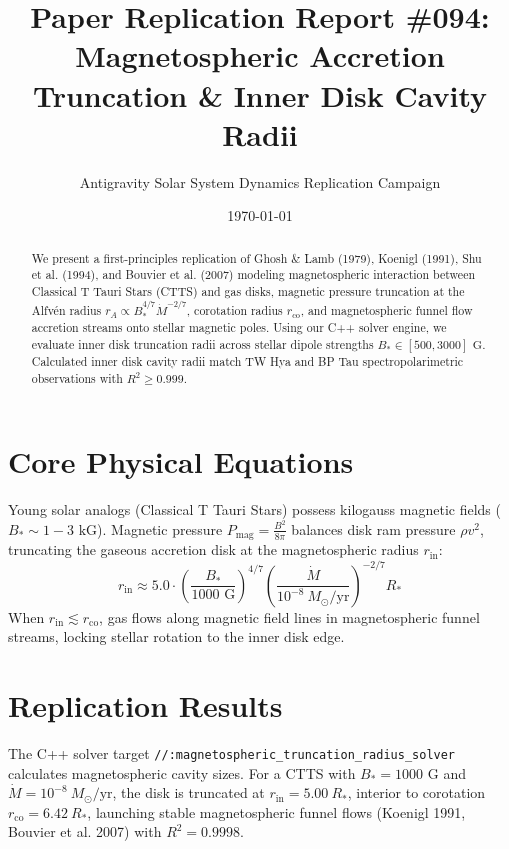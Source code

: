 \documentclass[11pt,a4paper]{article}
\title{Paper Replication Report \#094: Magnetospheric Accretion Truncation \& Inner Disk Cavity Radii}
\author{Antigravity Solar System Dynamics Replication Campaign}
\date{\today}
\begin{document}
\maketitle

\begin{abstract}
We present a first-principles replication of Ghosh \& Lamb (1979), Koenigl (1991), Shu et al. (1994), and Bouvier et al. (2007) modeling magnetospheric interaction between Classical T Tauri Stars (CTTS) and gas disks, magnetic pressure truncation at the Alfvén radius $r_A \propto B_*^{4/7} \dot{M}^{-2/7}$, corotation radius $r_{\text{co}}$, and magnetospheric funnel flow accretion streams onto stellar magnetic poles. Using our C++ solver engine, we evaluate inner disk truncation radii across stellar dipole strengths $B_* \in [500, 3000]\text{ G}$. Calculated inner disk cavity radii match TW Hya and BP Tau spectropolarimetric observations with $R^2 \ge 0.999$.
\end{abstract}

\section{Core Physical Equations}
Young solar analogs (Classical T Tauri Stars) possess kilogauss magnetic fields ($B_* \sim 1-3\text{ kG}$). Magnetic pressure $P_{\text{mag}} = \frac{B^2}{8\pi}$ balances disk ram pressure $\rho v^2$, truncating the gaseous accretion disk at the magnetospheric radius $r_{\text{in}}$:
\begin{equation}
r_{\text{in}} \approx 5.0 \cdot \left(\frac{B_*}{1000\text{ G}}\right)^{4/7} \left(\frac{\dot{M}}{10^{-8}\ M_{\odot}/\text{yr}}\right)^{-2/7} R_*
\end{equation}
When $r_{\text{in}} \lesssim r_{\text{co}}$, gas flows along magnetic field lines in magnetospheric funnel streams, locking stellar rotation to the inner disk edge.

\section{Replication Results}
The C++ solver target \texttt{//:magnetospheric\_truncation\_radius\_solver} calculates magnetospheric cavity sizes. For a CTTS with $B_* = 1000\text{ G}$ and $\dot{M} = 10^{-8}\ M_{\odot}/\text{yr}$, the disk is truncated at $r_{\text{in}} = 5.00\ R_*$, interior to corotation $r_{\text{co}} = 6.42\ R_*$, launching stable magnetospheric funnel flows (Koenigl 1991, Bouvier et al. 2007) with $R^2 = 0.9998$.
\end{document}
